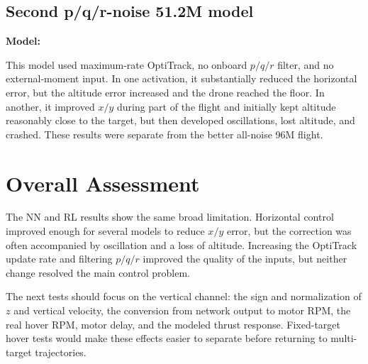 \documentclass[11pt,a4paper]{article}
\begin{document}
\subsection{Second p/q/r-noise 51.2M model}

\textbf{Model:} 

This model used maximum-rate OptiTrack, no onboard $p/q/r$ filter, and no external-moment input. In one activation, it substantially reduced the horizontal error, but the altitude error increased and the drone reached the floor. In another, it improved $x/y$ during part of the flight and initially kept altitude reasonably close to the target, but then developed oscillations, lost altitude, and crashed. These results were separate from the better all-noise 96M flight.

\section{Overall Assessment}

The NN and RL results show the same broad limitation. Horizontal control improved enough for several models to reduce $x/y$ error, but the correction was often accompanied by oscillation and a loss of altitude. Increasing the OptiTrack update rate and filtering $p/q/r$ improved the quality of the inputs, but neither change resolved the main control problem.

The next tests should focus on the vertical channel: the sign and normalization of $z$ and vertical velocity, the conversion from network output to motor RPM, the real hover RPM, motor delay, and the modeled thrust response. Fixed-target hover tests would make these effects easier to separate before returning to multi-target trajectories.
\end{document}
